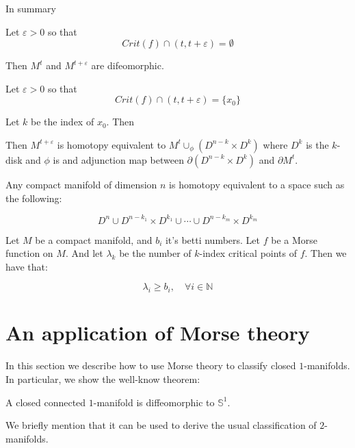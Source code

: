 In summary

\begin{theorem}
\cite{mor1934}
Let $\varepsilon>0$ so that
$$Crit(f)\cap (t,t+\varepsilon)=\emptyset$$

Then   $M^{t}$ and $M^{t+\varepsilon}$ 
are difeomorphic.


\end{theorem}

\begin{theorem}
\cite{mor1934}
Let $\varepsilon>0$ so that
$$Crit(f)\cap (t,t+\varepsilon)=\{x_0\}$$

Let $k$ be the index of $x_0$. Then

Then  $M^{t+\varepsilon}$ 
is homotopy equivalent to $M^t\cup_\phi (D^{n-k}\times D^k)$ where
$D^k$ is the $k$-disk and $\phi$ is and adjunction map
between $\partial (D^{n-k}\times D^k)$ and $\partial M^t$.


\end{theorem}


\begin{corollary}
\cite{sma1961}
Any compact manifold 
of dimension $n$
is homotopy equivalent to a space such as the following:

$$
D^n\cup
D^{n-k_1}\times D^{k_1}
\cup
\cdots
\cup
D^{n-k_m}\times D^{k_m}
$$
\end{corollary}


\begin{theorem}
Let $M$ be a compact manifold, and $b_i$ it's betti numbers.
Let $f$ be a Morse function on $M$. And let $\lambda_k$ be the 
number of $k$-index critical points of $f$. Then we have that:

$$
\lambda_i\geq b_i,\quad
\forall i\in\mathbb{N}
$$

\end{theorem}

\section{An application of Morse theory}

In this section we describe how to use Morse theory to classify closed $1$-manifolds.
In particular, we show the well-know theorem:

\begin{theorem}
A closed connected $1$-manifold is diffeomorphic to $\mathbb{S}^1$.
\end{theorem}

We briefly mention that it can be used to derive the usual classification of $2$-manifolds.





